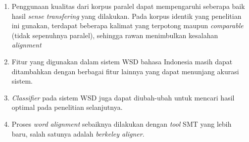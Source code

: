 \begin{enumerate}
	\item Penggunaan kualitas dari korpus paralel dapat mempengaruhi seberapa baik hasil \textit{sense transfering} yang dilakukan. Pada korpus identik yang penelitian ini gunakan, terdapat beberapa kalimat yang terpotong maupun \textit{comparable} (tidak sepenuhnya paralel), sehingga rawan menimbulkan kesalahan \textit{alignment}
	\item Fitur yang digunakan dalam sistem WSD bahasa Indonesia masih dapat ditambahkan dengan berbagai fitur lainnya yang dapat menunjang akurasi sistem.
	\item \textit{Classifier} pada sistem WSD juga dapat diubah-ubah untuk mencari hasil optimal pada penelitian selanjutnya.
	\item Proses \textit{word alignment} sebaiknya dilakukan dengan \textit{tool} SMT yang lebih baru, salah satunya adalah \textit{berkeley aligner}.
\end{enumerate}